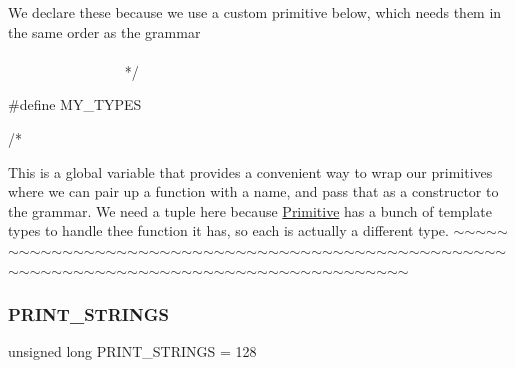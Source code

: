 \begin{DoxyCode}
    We declare these because we use a custom primitive below, which needs them in the 
    same order as the grammar
   ~~~~~~~~~~~~~~~~~~~~~~~~~~~~~~~~~~~~~~~~~~~~~~~~~~~~~~~~~~~~~~~~~~~~~~~~~~~~~~~~~~~~~~~~ */

\textcolor{preprocessor}{#define MY\_TYPES}

\textcolor{comment}{/*}
\end{DoxyCode}
 This is a global variable that provides a convenient way to wrap our primitives where we can pair up a function with a name, and pass that as a constructor to the grammar. We need a tuple here because \hyperlink{struct_primitive}{Primitive} has a bunch of template types to handle thee function it has, so each is actually a different type. $\sim$$\sim$$\sim$$\sim$$\sim$$\sim$$\sim$$\sim$$\sim$$\sim$$\sim$$\sim$$\sim$$\sim$$\sim$$\sim$$\sim$$\sim$$\sim$$\sim$$\sim$$\sim$$\sim$$\sim$$\sim$$\sim$$\sim$$\sim$$\sim$$\sim$$\sim$$\sim$$\sim$$\sim$$\sim$$\sim$$\sim$$\sim$$\sim$$\sim$$\sim$$\sim$$\sim$$\sim$$\sim$$\sim$$\sim$$\sim$$\sim$$\sim$$\sim$$\sim$$\sim$$\sim$$\sim$$\sim$$\sim$$\sim$$\sim$$\sim$$\sim$$\sim$$\sim$$\sim$$\sim$$\sim$$\sim$$\sim$$\sim$$\sim$$\sim$$\sim$$\sim$$\sim$$\sim$$\sim$$\sim$$\sim$$\sim$$\sim$$\sim$$\sim$$\sim$$\sim$$\sim$$\sim$$\sim$$\sim$ \mbox{\label{_formal_language_theory-_complex_2_main_8cpp_ad098fee1c76be478fe0683197334c489}} 
\subsubsection{\texorpdfstring{P\+R\+I\+N\+T\+\_\+\+S\+T\+R\+I\+N\+GS}{PRINT\_STRINGS}}
{\footnotesize\ttfamily unsigned long P\+R\+I\+N\+T\+\_\+\+S\+T\+R\+I\+N\+GS = 128}

\mbox{\label{_formal_language_theory-_complex_2_main_8cpp_ada34ee41f51e229e0d5e00b99aed5991}} 
